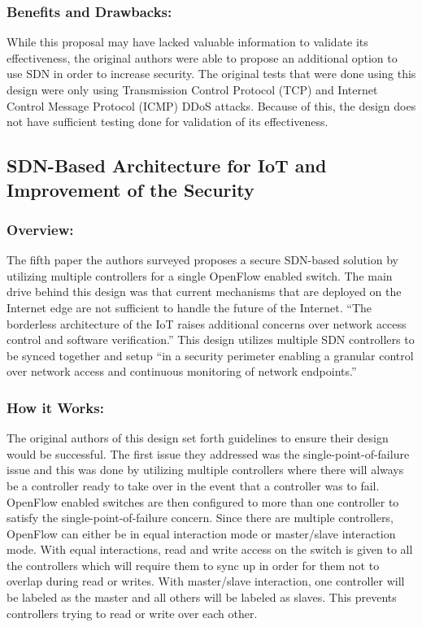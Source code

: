 \subsubsection {Benefits and Drawbacks:}
\smallskip

While this proposal may have lacked valuable information to validate its effectiveness, the original authors were able to propose an additional option to use SDN in order to increase security. The original tests that were done using this design were only using Transmission Control Protocol (TCP) and Internet Control Message Protocol (ICMP) DDoS attacks. Because of this, the design does not have sufficient testing done for validation of its effectiveness.

\subsection {SDN-Based Architecture for IoT and Improvement of the Security}
\subsubsection {Overview:}
\smallskip

The fifth paper the authors surveyed proposes a secure SDN-based solution by utilizing multiple controllers for a single OpenFlow enabled switch. The main drive behind this design was that current mechanisms that are deployed on the Internet edge are not sufficient to handle the future of the Internet. “The borderless architecture of the IoT raises additional concerns over network access control and software verification.” \cite {flauzac2015sdn} This design utilizes multiple SDN controllers to be synced together and setup “in a security perimeter enabling a granular control over network access and continuous monitoring of network endpoints.” \cite {flauzac2015sdn}

\subsubsection {How it Works:}
\smallskip

The original authors of this design set forth guidelines to ensure their design would be successful. The first issue they addressed was the single-point-of-failure issue and this was done by utilizing multiple controllers where there will always be a controller ready to take over in the event that a controller was to fail. OpenFlow enabled switches are then configured to more than one controller to satisfy the single-point-of-failure concern. Since there are multiple controllers, OpenFlow can either be in equal interaction mode or master/slave interaction mode. With equal interactions, read and write access on the switch is given to all the controllers which will require them to sync up in order for them not to overlap during read or writes. With master/slave interaction, one controller will be labeled as the master and all others will be labeled as slaves. This prevents controllers trying to read or write over each other. 

